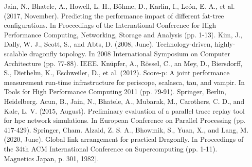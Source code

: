 \documentclass[conference]{IEEEtran}
\begin{document}
\begin{thebibliography}{00}

 Jain, N., Bhatele, A., Howell, L. H., Böhme, D., Karlin, I., León, E. A., et al. (2017, November). Predicting the performance impact of different fat-tree configurations. In Proceedings of the International Conference for High Performance Computing, Networking, Storage and Analysis (pp. 1-13).
 Kim, J., Dally, W. J., Scott, S., and Abts, D. (2008, June). Technology-driven, highly-scalable dragonfly topology. In 2008 International Symposium on Computer Architecture (pp. 77-88). IEEE.
 Knüpfer, A., Rössel, C., an Mey, D., Biersdorff, S., Diethelm, K., Eschweiler, D., et al. (2012). Score-p: A joint performance measurement run-time infrastructure for periscope, scalasca, tau, and vampir. In Tools for High Performance Computing 2011 (pp. 79-91). Springer, Berlin, Heidelberg.
 Acun, B., Jain, N., Bhatele, A., Mubarak, M., Carothers, C. D., and Kale, L. V. (2015, August). Preliminary evaluation of a parallel trace replay tool for hpc network simulations. In European Conference on Parallel Processing (pp. 417-429). Springer, Cham.
 Alzaid, Z. S. A., Bhowmik, S., Yuan, X., and Lang, M. (2020, June). Global link arrangement for practical Dragonfly. In Proceedings of the 34th ACM International Conference on Supercomputing (pp. 1-11). Magnetics Japan, p. 301, 1982].

\end{thebibliography}
\vspace{12pt}
\end{document}
